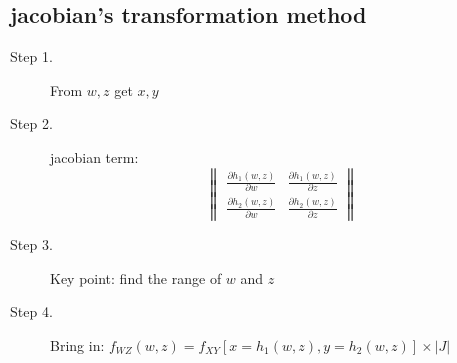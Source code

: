 \documentclass[12pt]{article}
\begin{document}
\subsection*{jacobian's transformation method}
\begin{description}
    \item[Step 1.] From $w,z$ get $x,y$
    \item[Step 2.] 
        jacobian term:
        \begin{equation*}
            \begin{Vmatrix}
                \frac{\partial h_1(w,z)}{\partial w} & \frac{\partial h_1(w,z)}{\partial z} \\
                \frac{\partial h_2(w,z)}{\partial w} & \frac{\partial h_2(w,z)}{\partial z}
            \end{Vmatrix}
        \end{equation*}
    \item[Step 3.] Key point: find the range of $w$ and $z$
    \item[Step 4.] Bring in: $f_{WZ}(w,z) = f_{XY}[x = h_1(w,z), y = h_2(w,z)]\times |J|$   
\end{description}
\end{document}
